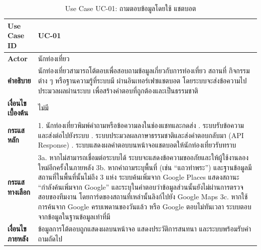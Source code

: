 \nopagebreak
\begin{table}[H]
\centering
\caption{Use Case UC-01: ถามตอบข้อมูลโดยใช้ แชตบอต}
\label{tab:uc01}
\begin{tabular}{|p{3.2cm}|p{10cm}|}
\hline
\textbf{Use Case ID} & UC-01 \\ \hline
\textbf{Actor} & นักท่องเที่ยว \\ \hline
\textbf{คำอธิบาย} & นักท่องเที่ยวสามารถโต้ตอบเพื่อสอบถามข้อมูลเกี่ยวกับการท่องเที่ยว สถานที่ กิจกรรมต่าง ๆ หรือฐานความรู้ที่ระบบมี ผ่านอินเทอร์เฟซแชตบอต โดยระบบจะส่งข้อความไปประมวลผลผ่านระบบ เพื่อสร้างคำตอบที่ถูกต้องและเป็นธรรมชาติ \\ \hline
\textbf{เงื่อนไขเบื้องต้น} & ไม่มี \\ \hline
\textbf{กระแสหลัก} & 1. นักท่องเที่ยวพิมพ์คำถามหรือข้อความลงในช่องแชทและกดส่ง \newline 2. ระบบรับข้อความและส่งต่อไปยังระบบ \newline 3. ระบบประมวลผลภาษาธรรมชาติและส่งคำตอบกลับมา (API Response) \newline 4. ระบบแสดงผลคำตอบบนหน้าจอแชตบอตให้นักท่องเที่ยวรับทราบ \\ \hline
\textbf{กระแสทางเลือก} & 3a. หากไม่สามารถเชื่อมต่อระบบได้ ระบบจะแสดงข้อความขออภัยและให้ผู้ใช้งานลองใหม่อีกครั้งในภายหลัง \newline 3b. หากคำถามระบุพื้นที่ (เช่น ``แถวท่าพระ'') และฐานข้อมูลมีสถานที่ในพื้นที่นั้นไม่ถึง 3 แห่ง ระบบค้นเพิ่มจาก Google Places แสดงสถานะ ``กำลังค้นเพิ่มจาก Google'' และระบุในคำตอบว่าข้อมูลส่วนนั้นยังไม่ผ่านการตรวจสอบของทีมงาน โดยการ์ดของสถานที่เหล่านั้นลิงก์ไปยัง Google Maps \newline 3c. หากใช้การค้นจาก Google ครบเพดานของวันแล้ว หรือ Google ตอบไม่ทันเวลา ระบบตอบจากข้อมูลในฐานข้อมูลเท่าที่มี \\ \hline
\textbf{เงื่อนไขภายหลัง} & ข้อมูลการโต้ตอบถูกแสดงผลบนหน้าจอ แสดงประวัติการสนทนา และระบบพร้อมรับคำถามถัดไป \\
\hline
\end{tabular}
\end{table}

